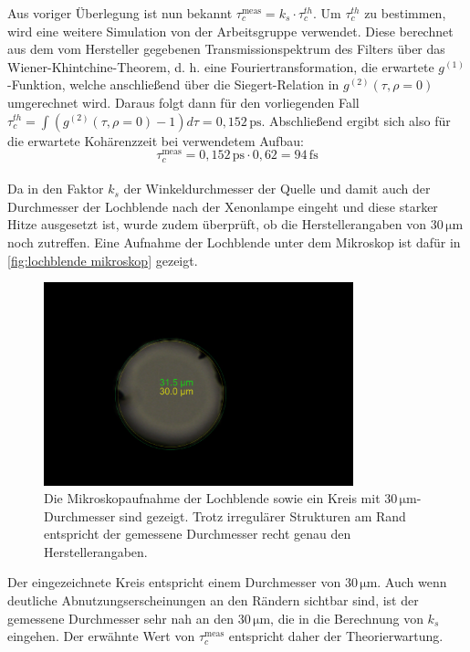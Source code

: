 Aus voriger Überlegung ist nun bekannt $\tau_c^{\mathrm{meas}} = k_s\cdot\tau_c^{th}$. 
Um $\tau_c^{th}$ zu bestimmen, wird eine weitere Simulation von der Arbeitsgruppe verwendet. 
Diese berechnet aus dem vom Hersteller gegebenen Transmissionspektrum des Filters über das Wiener-Khintchine-Theorem, d. h. eine Fouriertransformation, die erwartete $g^{(1)}$-Funktion, welche anschließend über die Siegert-Relation in $g^{(2)}(\tau, \rho=0)$ umgerechnet wird. 
Daraus folgt dann für den vorliegenden Fall $\tau_c^{th} = \int \left(g^{(2)}(\tau, \rho=0) -1\right) d\tau = 0,152\,\mathrm{ps}$. 
Abschließend ergibt sich also für die erwartete Kohärenzzeit bei verwendetem Aufbau:
\begin{equation}
    \tau_c^{\mathrm{meas}} = 0,152\,\mathrm{ps}\cdot 0,62 = 94\,\mathrm{fs}
    \label{eq:tau_c_th}
\end{equation}\\

Da in den Faktor $k_s$ der Winkeldurchmesser der Quelle und damit auch der Durchmesser der Lochblende nach der Xenonlampe eingeht und diese starker Hitze ausgesetzt ist, wurde zudem überprüft, ob die Herstellerangaben von 30\,$\mathrm{\mu m}$ noch zutreffen. 
Eine Aufnahme der Lochblende unter dem Mikroskop ist dafür in \autoref{fig:lochblende mikroskop} gezeigt. 
\begin{figure}[h]
    \centering
    \includegraphics[width=0.8\textwidth]{images/Aufbau/pinholes.png}
    \caption{Die Mikroskopaufnahme der Lochblende sowie ein Kreis mit $30\,\mathrm{\mu m}$-Durchmesser sind gezeigt. Trotz irregulärer Strukturen am Rand entspricht der gemessene Durchmesser recht genau den Herstellerangaben.}
    \label{fig:lochblende mikroskop}
\end{figure}
Der eingezeichnete Kreis entspricht einem Durchmesser von $30\,\mathrm{\mu m}$. 
Auch wenn deutliche Abnutzungserscheinungen an den Rändern sichtbar sind, ist der gemessene Durchmesser sehr nah an den $30\,\mathrm{\mu m}$, die in die Berechnung von $k_s$ eingehen. 
Der erwähnte Wert von $\tau_c^{\mathrm{meas}}$ entspricht daher der Theorierwartung. 
